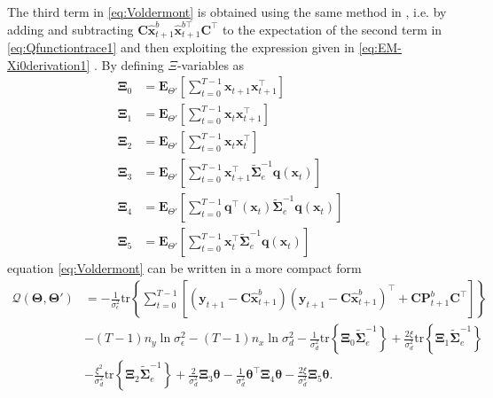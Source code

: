 \documentclass[]{article}
\begin{document}
The third term in \eqref{eq:Voldermont} is obtained using the same method in \cite{Shumway2000}, i.e. by adding and subtracting $\mathbf C \mathbf{\hat{x}}_{t+1}^b \mathbf{\hat{x}}_{t+1}^{b\top} \mathbf C^\top$ to the expectation of the second term in \eqref{eq:Qfunctiontrace1} and then exploiting the expression given in \eqref{eq:EM-Xi0derivation1} . By defining $\Xi$-variables as 
\begin{align}
	\boldsymbol\Xi_{0}&=\mathbf E_{\Theta'}\left[\sum_{t=0}^{T-1}\mathbf x_{t+1}\mathbf x_{t+1}^\top\right]\label{eq:defofXi0} \\
\boldsymbol\Xi_{1}&=\mathbf E_{\Theta'}\left[\sum_{t=0}^{T-1}\mathbf x_t\mathbf x_{t+1}^\top\right]\label{eq:defofXi1} \\
\boldsymbol\Xi_{2}&=\mathbf E_{\Theta'}\left[\sum_{t=0}^{T-1}\mathbf x_t\mathbf x_{t}^\top\right]\label{eq:defofXi2}\\
\boldsymbol\Xi_{3}&=\mathbf E_{\Theta'}\left[\sum_{t=0}^{T-1}\mathbf x_{t+1}^\top\tilde{\boldsymbol\Sigma}_e^{-1}\mathbf q( \mathbf x_t)\right] \label{eq:defofXi3} \\	
\boldsymbol\Xi_{4}&= \mathbf E_{\Theta'}\left[\sum_{t=0}^{T-1}  \mathbf q^\top(\mathbf  x_t)\tilde{\boldsymbol\Sigma}_e^{-1} \mathbf q(\mathbf x_t)\right] \label{eq:defofXi4}\\
 \boldsymbol\Xi_{5}&=\mathbf E_{\Theta'}\left[\sum_{t=0}^{T-1} \mathbf x_t^\top\tilde{\boldsymbol\Sigma}_e^{-1}\mathbf q(\mathbf x_t)  \right] \label{eq:defofXi5}
 \end{align}
equation \eqref{eq:Voldermont} can be written in a more compact form
\begin{align}\label{eq:VoldermontwitXivariables}
 \mathcal Q(\boldsymbol \Theta,\boldsymbol\Theta')&=-\frac{1}{\sigma_{\epsilon}^2}\mathrm{tr}\left\lbrace\boldsymbol\sum_{t=0}^{T-1}\left[ (\mathbf y_{t+1}-\mathbf C\mathbf{\hat{x}}_{t+1}^b) (\mathbf y_{t+1}-\mathbf C\mathbf{\hat{x}}_{t+1}^b)^\top+\mathbf C \mathbf P_{t+1}^b\mathbf C^\top\right] \right\rbrace\nonumber \\
&-(T-1)n_y\ln \sigma_{\epsilon}^2-(T-1)n_x\ln\sigma_d^2-\frac{1}{\sigma_d^2}\mathrm{tr}\left\lbrace \boldsymbol\Xi_{0} \tilde{\boldsymbol\Sigma}_e^{-1}\right\rbrace +\frac{2\xi}{\sigma_d^2} \mathrm{tr}\left\lbrace \boldsymbol\Xi_{1} \tilde{\boldsymbol\Sigma}_e^{-1}\right\rbrace 
 \nonumber \\
&-\frac{\xi^2}{\sigma_d^2}\mathrm{tr} \left\lbrace\boldsymbol\Xi_{2}\tilde{\boldsymbol\Sigma}_e^{-1} \right\rbrace +\frac{2}{\sigma_d^2}\boldsymbol\Xi_{3}\boldsymbol\theta-\frac{1}{\sigma_d^2}\boldsymbol\theta^\top \boldsymbol\Xi_{4}\boldsymbol\theta-\frac{2\xi}{\sigma_d^2}\boldsymbol \Xi_{5} \boldsymbol\theta.
\end{align}
\end{document}

